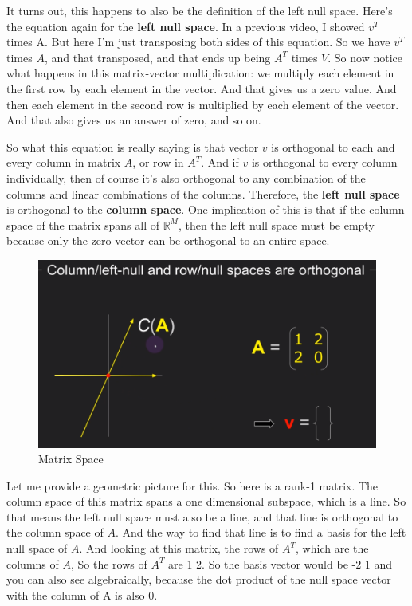 \documentclass[fleqn,10pt]{olplainarticle}
\theoremstyle{definition}
\theoremstyle{remark}
\begin{document}
It turns out, this happens to also be the definition of the left null space. Here's the equation again for the \textbf{left null space}. In a previous video, I showed $v^T$ times A. But here I'm just transposing both sides of this equation. So we have $v^T$ times $A$, and that transposed, and that ends up being $A^T$ times $V$. So now notice what happens in this matrix-vector multiplication: we multiply each element in the first row by each element in the vector. And that gives us a zero value. And then each element in the second row is multiplied by each element of the vector. And that also gives us an answer of zero, and so on.

So what this equation is really saying is that vector $v$ is orthogonal to each and every column in matrix $A$, or row in $A^T$. And if $v$ is orthogonal to every column individually, then of course it's also orthogonal to any combination of the columns and linear combinations of the columns. Therefore, the \textbf{left null space} is orthogonal to the \textbf{column space}. One implication of this is that if the column space of the matrix spans all of $\mathbb{R}^M$, then the left null space must be empty because only the zero vector can be orthogonal to an entire space.

\begin{figure}[ht]
	\centering
	\includegraphics[width=0.6\linewidth]{images/matrix-space-29.png}
	\caption{Matrix Space}
	\label{fig:matrix_space_29}
\end{figure}

Let me provide a geometric picture for this. So here is a rank-1 matrix. The column space of this matrix spans a one dimensional subspace, which is a line. So that means the left null space must also be a line, and that line is orthogonal to the column space of $A$. And the way to find that line is to find a basis for the left null space of $A$. And looking at this matrix, the rows of $A^T$, which are the columns of $A$, So the rows of $A^T$ are 1 2. So the basis vector would be -2 1 and you can also see algebraically, because the dot product of the null space vector with the column of A is also 0.
\end{document}
